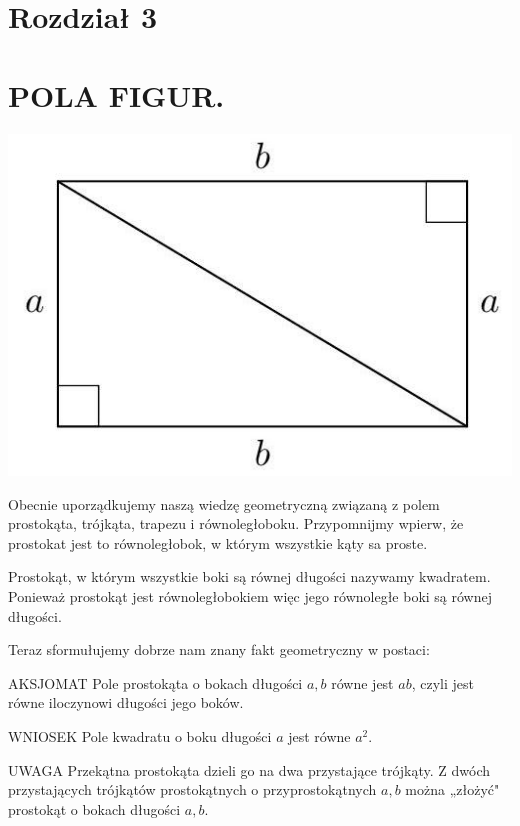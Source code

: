 \documentclass[10pt]{article}
\begin{document}
\section*{Rozdział 3}
\section*{POLA FIGUR.}
\begin{center}
\includegraphics[max width=\textwidth]{2024_11_21_71f62bd117d375398909g-028}
\end{center}

Obecnie uporządkujemy naszą wiedzę geometryczną związaną z polem prostokąta, trójkąta, trapezu i równoległoboku. Przypomnijmy wpierw, że prostokat jest to równoległobok, w którym wszystkie kąty sa proste.

Prostokąt, w którym wszystkie boki są równej długości nazywamy kwadratem. Ponieważ prostokąt jest równoległobokiem więc jego równoległe boki są równej długości.

Teraz sformułujemy dobrze nam znany fakt geometryczny w postaci:

AKSJOMAT Pole prostokąta o bokach długości \(a, b\) równe jest \(a b\), czyli jest równe iloczynowi długości jego boków.

WNIOSEK Pole kwadratu o boku długości \(a\) jest równe \(a^{2}\).

UWAGA Przekątna prostokąta dzieli go na dwa przystające trójkąty. Z dwóch przystających trójkątów prostokątnych o przyprostokątnych \(a, b\) można „złożyć" prostokąt o bokach długości \(a, b\).
\end{document}
